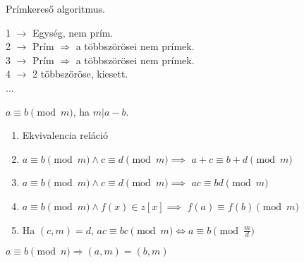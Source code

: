 \begin{frame}
  \begin{tcolorbox}[title={Def.: Erathosztenész Szitája}]
    Prímkereső algoritmus.\\
    \mbigskip

    1 $\rightarrow$ Egység, nem prím.\\
    2 $\rightarrow$ Prím $\Rightarrow$ a többszörösei nem prímek.\\
    3 $\rightarrow$ Prím $\Rightarrow$ a többszörösei nem prímek.\\
    4 $\rightarrow$ 2 többszöröse, kiesett.\\
    ...
  \end{tcolorbox}
\end{frame}

\begin{frame}
  \begin{tcolorbox}[title={Def.: Lineáris Kongruencia}]
    $a \equiv b \pmod{m}$, ha $m | a - b$.
  \end{tcolorbox}

  \begin{tcolorbox}[title={Tétel: Kongruencia tulajdonságai}]
    \begin{enumerate}
      \item Ekvivalencia reláció
      \item $a \equiv b \pmod{m} \land c \equiv d \pmod{m} \implies$ \textbf{$a + c \equiv b + d \pmod{m}$}
      \item $a \equiv b \pmod{m} \land c \equiv d \pmod{m} \implies$ \textbf{$ac \equiv bd \pmod{m}$}
      \item $a \equiv b \pmod{m} \land f(x) \in z[x] \implies$ \textbf{$f(a) \equiv f(b) \pmod{m}$}
      \item Ha $(c, m) = d$, $ac \equiv bc \pmod{m} \iff a \equiv b \pmod{\frac{m}{d}}$
    \end{enumerate}
  \end{tcolorbox}

  \begin{tcolorbox}[title={Ész}]
    $a \equiv b \pmod{n} \Rightarrow (a, m) = (b, m)$
  \end{tcolorbox}
\end{frame}

